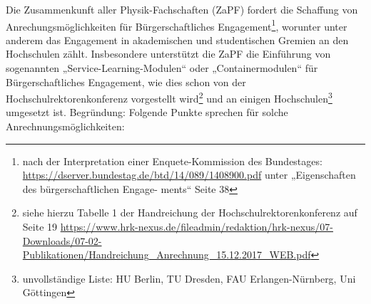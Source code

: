 \documentclass[DIV=calc]{scrartcl}
\begin{document}
Die Zusammenkunft aller Physik-Fachschaften (ZaPF) fordert die Schaffung von Anrechungsmöglichkeiten für Bürgerschaftliches Engagement\footnote{nach der Interpretation einer Enquete-Kommission des Bundestages: \url{https://dserver.bundestag.de/btd/14/089/1408900.pdf} unter „Eigenschaften des bürgerschaftlichen Engage- ments“ Seite 38}, worunter unter anderem das Engagement in akademischen und studentischen Gremien an den Hochschulen zählt. Insbesondere unterstützt die ZaPF die Einführung von sogenannten „Service-Learning-Modulen“ oder „Containermodulen“ für Bürgerschaftliches Engagement, wie dies schon von der Hochschulrektorenkonferenz vorgestellt wird\footnote{siehe hierzu Tabelle 1 der Handreichung der Hochschulrektorenkonferenz auf Seite 19 \url{https://www.hrk-nexus.de/fileadmin/redaktion/hrk-nexus/07-Downloads/07-02-Publikationen/Handreichung_Anrechnung_15.12.2017_WEB.pdf}} und an einigen Hochschulen\footnote{unvollständige Liste: HU Berlin, TU Dresden, FAU Erlangen-Nürnberg, Uni Göttingen} umgesetzt ist.
Begründung:
Folgende Punkte sprechen für solche Anrechnungsmöglichkeiten:
\end{document}
